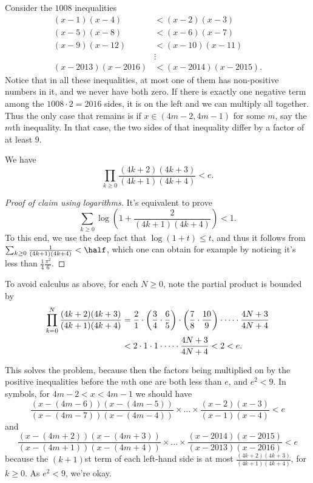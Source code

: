 \documentclass[11pt]{scrartcl}
\begin{document}
Consider the $1008$ inequalities
\begin{align*}
  (x-1)(x-4) &< (x-2)(x-3) \\
  (x-5)(x-8) &< (x-6)(x-7) \\
  (x-9)(x-12) &< (x-10)(x-11) \\
  &\vdots \\
  (x-2013)(x-2016) &< (x-2014)(x-2015).
\end{align*}
Notice that in all these inequalities, at most one of them
has non-positive numbers in it, and we never have both zero.
If there is exactly one negative term among the $1008 \cdot 2 = 2016$ sides,
it is on the left and we can multiply all together.
Thus the only case that remains is if $x \in (4m-2, 4m-1)$ for some $m$,
say the $m$th inequality.
In that case, the two sides of that inequality differ by a factor of at least $9$.

\begin{claim*}
  We have \[ \prod_{k \ge 0} \frac{(4k+2)(4k+3)}{(4k+1)(4k+4)} < e. \]
\end{claim*}
\begin{proof}
  [Proof of claim using logarithms]
  It's equivalent to prove
  \[ \sum_{k \ge 0} \log \left( 1 + \frac{2}{(4k+1)(4k+4)} \right) < 1. \]
  To this end, we use the deep fact that $\log(1+t) \le t$,
  and thus it follows from
  $\sum_{k \ge 0} \frac{1}{(4k+1)(4k+4)} < \half$,
  which one can obtain for example by noticing
  it's less than $\frac14\frac{\pi^2}{6}$.
\end{proof}
\begin{remark*}
  To avoid calculus as above, for each $N \ge 0$, note the partial product is bounded by
  \begin{align*}
    \prod_{k=0}^N \frac{(4k+2)(4k+3)}{(4k+1)(4k+4)}
    &=
    \frac 21 \cdot \left( \frac 34 \cdot \frac 65 \right)
      \cdot \left( \frac 78 \cdot \frac{10}{9} \right) \cdot \dots
      \cdot \frac{4N+3}{4N+4} \\
    &< 2 \cdot 1 \cdot 1 \cdot \dots \cdot \frac{4N+3}{4N+4}
    < 2 < e. \qedhere
  \end{align*}
\end{remark*}

This solves the problem, because then the factors being multiplied
on by the positive inequalities before the
$m$th one are both less than $e$, and $e^2 < 9$.
In symbols, for $4m-2 < x < 4m-1$ we should have
\[ \frac{(x-(4m-6))(x-(4m-5))}{(x-(4m-7))(x-(4m-4))}
  \times \dots \times \frac{(x-2)(x-3)}{(x-1)(x-4)} < e \]
and
\[ \frac{(x-(4m+2))(x-(4m+3))}{(x-(4m+1))(x-(4m+4))}
  \times \dots \times \frac{(x-2014)(x-2015)}{(x-2013)(x-2016)} < e \]
because the $(k+1)$st term of each left-hand side
is at most $\frac{(4k+2)(4k+3)}{(4k+1)(4k+4)}$, for $k \ge 0$.
As $e^2 < 9$, we're okay.
\pagebreak
\end{document}
